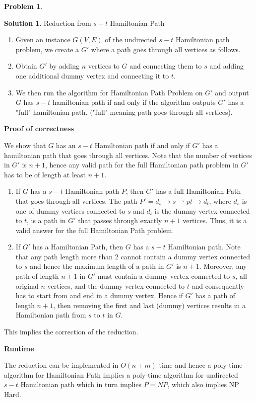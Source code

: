 \documentclass{article}
\theoremstyle{definition}
\newtheorem{problem}{Problem}
\newtheorem*{solution*}{Solution}
\newenvironment{solution}{\begin{solution*}}{{} \end{solution*}}
\begin{document}
\begin{problem}
\begin{enumerate}[label=(\alph*)]
			\medskip
		\begin{solution}
		Reduction from $s-t$ Hamiltonian Path
		\begin{enumerate}
		\item Given an instance $G(V, E)$ of the undirected $s-t$ Hamiltonian path problem, we create a $G'$ where a path goes through all vertices as follows.
		\item Obtain $G'$ by adding $n$ vertices to $G$ and connecting them to $s$ and adding one additional dummy vertex and connecting it to $t$. 
		\item We then run the algorithm for Hamiltonian Path Problem on $G'$ and output $G$ has $s-t$ hamiltonian path if and only if the algorithm outputs $G'$ has a "full" hamiltonian path. ("full" meaning path goes through all vertices).
		\end{enumerate}	

		\item\textbf{Proof of correctness}
		\item We show that $G$ has an $s-t$ Hamiltonian path if and only if $G'$ has a hamiltonian path that goes through all vertices. Note that the number of vertices in $G'$ is $n + 1$, hence any valid path for the full Hamiltonian path problem in $G'$ has to be of length at least $n + 1$.
		\begin{enumerate}
		\item If $G$ has a $s-t$ Hamiltonian path $P$, then $G'$ has a full Hamiltonian Path that goes through all vertices. The path $P' = d_s \rightarrow s \rightharpoonup p t \rightarrow d_t$, where $d_s$ is one of dummy vertices connected to $s$ and $d_t$ is the dummy vertex connected to $t$, is a path in $G'$ that passes through exactly $n + 1$ vertices. Thus, it is a valid answer for the full Hamiltonian Path problem.
		\item If $G'$ has a Hamiltonian Path, then $G$ has a $s-t$ Hamiltonian path. Note that any path length more than 2 cannot contain a dummy vertex connected to $s$ and hence the maximum length of a path in $G'$ is $n + 1$. Moreover, any path of length $n+1$ in $G'$ must contain a dummy vertex connected to $s$, all original $n$ vertices, and the dummy vertex connected to $t$ and consequently has to start from and end in a dummy vertex. Hence if $G'$ has a path of length $n + 1$, then removing the first and last (dummy) vertices results in a Hamiltonian path from $s$ to $t$ in $G$.
		\end{enumerate}
		\item This implies the correction of the reduction. 

		\item\textbf{Runtime}
		\item The reduction can be implemented in $O(n + m)$ time and hence a poly-time algorithm for Hamiltonian Path implies a poly-time algorithm for undirected $s-t$ Hamiltonian path which in turn implies $P=NP$, which also implies NP Hard. 

		\end{solution}
		
	\end{enumerate}
\end{problem}
\end{document}
